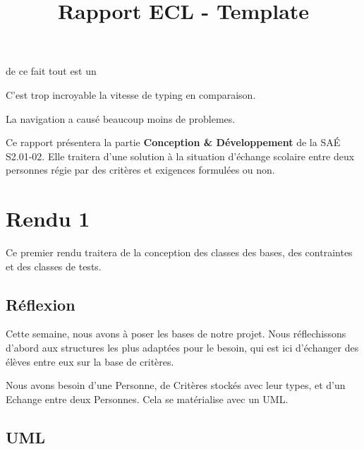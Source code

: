 \documentclass{mytex}
\title{Rapport ECL - Template} %
\begin{document}

de ce fait tout est un


C'est trop incroyable la vitesse de typing en comparaison.

La navigation a causé beaucoup moins de problemes.

        
\fairemarges %
\fairepagedegarde %
\tabledematieres %


Ce rapport présentera la partie \textbf{Conception \& Développement} de la SAÉ S2.01-02. Elle traitera d'une solution à la situation d'échange scolaire entre deux personnes régie par des critères et exigences formulées ou non.

\section{Rendu 1}

Ce premier rendu traitera de la conception des classes des bases, des contraintes et des classes de tests.

\subsection{Réflexion}

Cette semaine, nous avons à poser les bases de notre projet.
Nous réflechissons d'abord aux structures les plus adaptées pour le besoin, qui est ici d'échanger des élèves entre eux sur la base de critères.

Nous avons besoin d'une Personne, de Critères stockés avec leur types, et d'un Echange entre deux Personnes.
Cela se matérialise avec un UML.

\subsection{UML}
\end{document}
